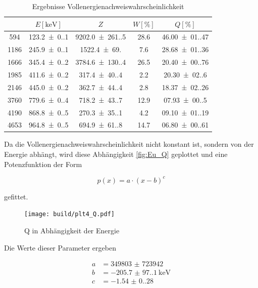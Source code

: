\begin{table}[H]
	\centering
	\caption{Ergebnisse Vollenergienachweiswahrscheinlichkeit}
	\begin{tabular}{c c c c c}
		\toprule
		\text{Channel} & $ E [\unit{\kilo\eV}] $ & $ Z $               & $ W [\%] $ & $ Q [\%] $         \\
		\midrule
		594            & \num{123.2(0.1)}        & \num{9202.0(261.5)} & \num{28.6} & \num{46.00(01.47)} \\
		1186           & \num{245.9(0.1)}        & \num{1522.4(69.0)}  & \num{7.6}  & \num{28.68(01.36)} \\
		1666           & \num{345.4(0.2)}        & \num{3784.6(130.4)} & \num{26.5} & \num{20.40(00.76)} \\
		1985           & \num{411.6(0.2)}        & \num{317.4(40.4)}   & \num{2.2}  & \num{20.30(02.60)} \\
		2146           & \num{445.0(0.2)}        & \num{362.7(44.4)}   & \num{2.8}  & \num{18.37(02.26)} \\
		3760           & \num{779.6(0.4)}        & \num{718.2(43.7)}   & \num{12.9} & \num{07.93(00.50)} \\
		4190           & \num{868.8(0.5)}        & \num{270.3(35.1)}   & \num{4.2}  & \num{09.10(01.19)} \\
		4653           & \num{964.8(0.5)}        & \num{694.9(61.8)}   & \num{14.7} & \num{06.80(00.61)} \\
		\bottomrule
	\end{tabular}
	\label{tab:data1}
\end{table}

Da die Vollenergienachweiswahrscheinlichkeit nicht konstant ist, sondern von
der Energie abhängt, wird diese Abhängigkeit \eqref{fig:Eu_Q} geplottet und
eine Potenzfunktion der Form

\begin{equation}
	p(x)=a \cdot (x-b)^c
\end{equation}

gefittet.

\begin{figure}[H]
	\centering
	\texttt{[image: build/plt4\_Q.pdf]}
	\caption{Q in Abhängigkeit der Energie}
	\label{fig:Eu_Q}
\end{figure}

Die Werte dieser Parameter ergeben

\begin{align*}
	a & =\num{349803(723942)}         \\
	b & =\qty{-205.7(97.1)}{\kilo\eV} \\
	c & =\num{-1.54(0.28)}
\end{align*}

